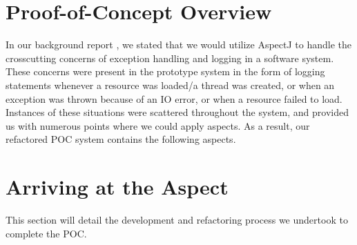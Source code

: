 \documentclass[sigconf]{acmart}
\begin{document}
\section{Proof-of-Concept Overview}
In our background report \cite{background-rept}, we stated that we would utilize AspectJ to handle the crosscutting concerns of exception handling and logging in a software system. These concerns were present in the prototype system in the form of logging statements whenever a resource was loaded/a thread was created, or when an exception was thrown because of an IO error, or when a resource failed to load. Instances of these situations were scattered throughout the system, and provided us with numerous points where we could apply aspects. As a result,  our refactored POC system contains the following aspects. 

\section{Arriving at the Aspect}
This section will detail the development and refactoring process we undertook to complete the POC.
\end{document}
